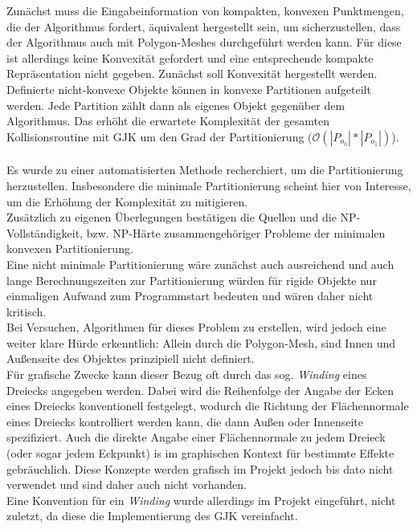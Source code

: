 Zunächst muss die Eingabeinformation von kompakten, konvexen Punktmengen, die der Algorithmus fordert, äquivalent hergestellt sein, um sicherzustellen, dass der Algorithmus auch mit Polygon-Meshes durchgeführt werden kann. Für diese ist allerdings keine Konvexität gefordert und eine entsprechende kompakte Repräsentation nicht gegeben.
Zunächst soll Konvexität hergestellt werden. Definierte nicht-konvexe Objekte können in konvexe Partitionen aufgeteilt werden. Jede Partition zählt dann als eigenes Objekt gegenüber dem Algorithmus. Das erhöht die erwartete Komplexität der gesamten Kollisionsroutine mit GJK um den Grad der Partitionierung ($\mathcal{O}(|P_{o_0}|*|P_{o_1}|)$).\\
\ \\
Es wurde zu einer automatisierten Methode recherchiert, um die Partitionierung herzustellen. Insbesondere die minimale Partitionierung scheint hier von Interesse, um die Erhöhung der Komplexität zu mitigieren.\\
Zusätzlich zu eigenen Überlegungen bestätigen die Quellen \cite{ARTIGAS20111968} und \cite{grelier2019minimum} die NP-Vollständigkeit, bzw. NP-Härte zusammengehöriger Probleme der minimalen konvexen Partitionierung.\\
Eine nicht minimale Partitionierung wäre zunächst auch ausreichend und auch lange Berechnungszeiten zur Partitionierung würden für rigide Objekte nur einmaligen Aufwand zum Programmstart bedeuten und wären daher nicht kritisch.\\
Bei Versuchen, Algorithmen für dieses Problem zu erstellen, wird jedoch eine weiter klare Hürde erkenntlich: Allein durch die Polygon-Mesh, sind Innen und Außenseite des Objektes prinzipiell nicht definiert.\\
Für grafische Zwecke kann dieser Bezug oft durch das sog. \textit{Winding} eines Dreiecks angegeben werden. Dabei wird die Reihenfolge der Angabe der Ecken eines Dreiecks konventionell festgelegt, wodurch die Richtung der Flächennormale eines Dreiecks kontrolliert werden kann, die dann Außen oder Innenseite spezifiziert. Auch die direkte Angabe einer Flächennormale zu jedem Dreieck (oder sogar jedem Eckpunkt) is im graphischen Kontext für bestimmte Effekte gebräuchlich. Diese Konzepte werden grafisch im Projekt jedoch bis dato nicht verwendet und sind daher auch nicht vorhanden.\\
Eine Konvention für ein \textit{Winding} wurde allerdings im Projekt eingeführt, nicht zuletzt, da diese die Implementierung des GJK vereinfacht.\\

